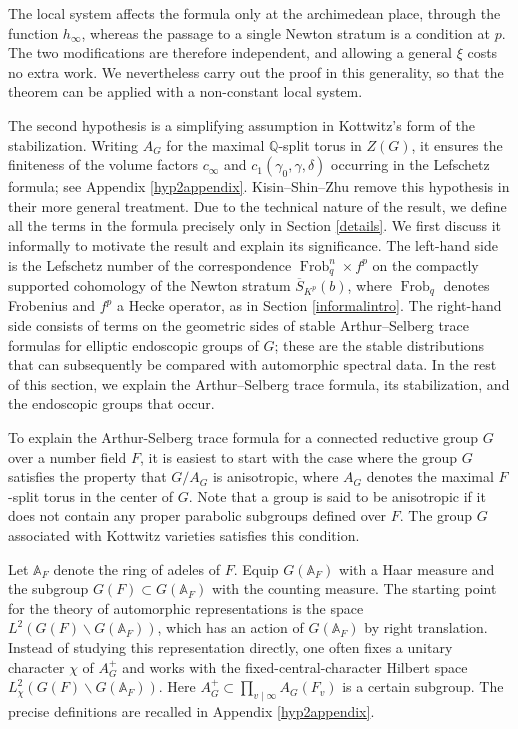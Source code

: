 \documentclass[11pt,a4paper]{article}
\theoremstyle{definition}
\theoremstyle{plain}
\theoremstyle{remark}
\theoremstyle{plain}
\DeclareMathOperator{\Frob}{Frob}
\begin{document}
The local system affects the formula only at the archimedean place, through the function $h_{\infty}$, whereas the passage to a single Newton stratum is a condition at $p$. The two modifications are therefore independent, and allowing a general $\xi$ costs no extra work. We nevertheless carry out the proof in this generality, so that the theorem can be applied with a non-constant local system.

The second hypothesis is a simplifying assumption in Kottwitz's form of the stabilization. Writing $A_G$ for the maximal $\mathbb{Q}$-split torus in $Z(G)$, it ensures the finiteness of the volume factors $c_{\infty}$ and $c_1(\gamma_0,\gamma,\delta)$ occurring in the Lefschetz formula; see Appendix \ref{hyp2appendix}. Kisin--Shin--Zhu remove this hypothesis in their more general treatment.
Due to the technical nature of the result, we define all the terms in the formula precisely only in Section \ref{details}. We first discuss it informally to motivate the result and explain its significance. The left-hand side is the Lefschetz number of the correspondence $\Frob_q^n \times f^p$ on the compactly supported cohomology of the Newton stratum $\overline{S}_{K^p}(b)$, where $\Frob_q$ denotes Frobenius and $f^p$ a Hecke operator, as in Section \ref{informalintro}. The right-hand side consists of terms on the geometric sides of stable Arthur--Selberg trace formulas for elliptic endoscopic groups of $G$; these are the stable distributions that can subsequently be compared with automorphic spectral data. In the rest of this section, we explain the Arthur--Selberg trace formula, its stabilization, and the endoscopic groups that occur.

To explain the Arthur-Selberg trace formula for a connected reductive group $G$ over a number field $F$, it is easiest to start with the case where the group $G$ satisfies the property that $G / A_G$ is anisotropic, where $A_G$ denotes the maximal $F$-split torus in the center of $G$. Note that a group is said to be anisotropic if it does not contain any proper parabolic subgroups defined over $F$. The group $G$ associated with Kottwitz varieties satisfies this condition.

Let $\mathbb{A}_F$ denote the ring of adeles of $F$. Equip $G(\mathbb{A}_F)$ with a Haar measure and the subgroup $G(F) \subset G(\mathbb{A}_F)$ with the counting measure. The starting point for the theory of automorphic representations is the space $L^2(G(F) \backslash G(\mathbb{A}_F))$, which has an action of $G(\mathbb{A}_F)$ by right translation. Instead of studying this representation directly, one often fixes a unitary character $\chi$ of $A_G^+$ and works with the fixed-central-character Hilbert space $L^2_{\chi}(G(F) \backslash G(\mathbb{A}_F))$. Here $A_G^+ \subset \prod_{v \mid \infty} A_G(F_v)$ is a certain subgroup. The precise definitions are recalled in Appendix \ref{hyp2appendix}.
\end{document}
